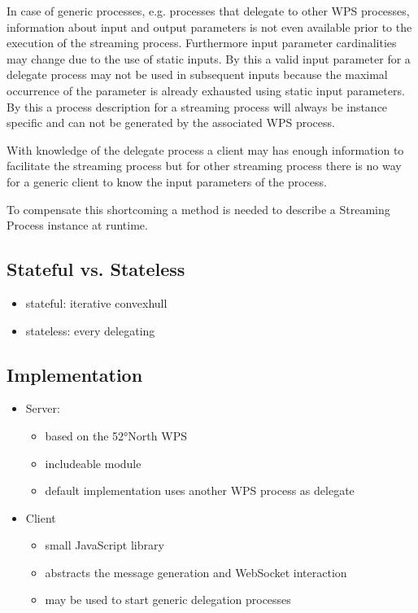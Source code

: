 		In case of generic processes, e.g. processes that delegate to other \ac{WPS} processes, information about input and output parameters is not even available prior to the execution of the streaming process. Furthermore input parameter cardinalities may change due to the use of static inputs. By this a valid input parameter for a delegate process may not be used in subsequent inputs because the maximal occurrence of the parameter is already exhausted using static input parameters. By this a process description for a streaming process will always be instance specific and can not be generated by the associated \ac{WPS} process.

		With knowledge of the delegate process a client may has enough information to facilitate the streaming process but for other streaming process there is no way for a generic client to know the input parameters of the process.

		To compensate this shortcoming a method is needed to describe a Streaming Process instance at runtime.
	\subsection{Stateful vs. Stateless}
	\begin{itemize}
		\item stateful: iterative convexhull
		\item stateless: every delegating
	\end{itemize}

	\subsection{Implementation}
	\begin{itemize}
		\item Server:
		\begin{itemize}
			\item based on the 52°North WPS
			\item includeable module
			\item default implementation uses another WPS process as delegate
		\end{itemize}
		\item Client
		\begin{itemize}
			\item small JavaScript library
			\item abstracts the message generation and WebSocket interaction
			\item may be used to start generic delegation processes
		\end{itemize}
	\end{itemize}
